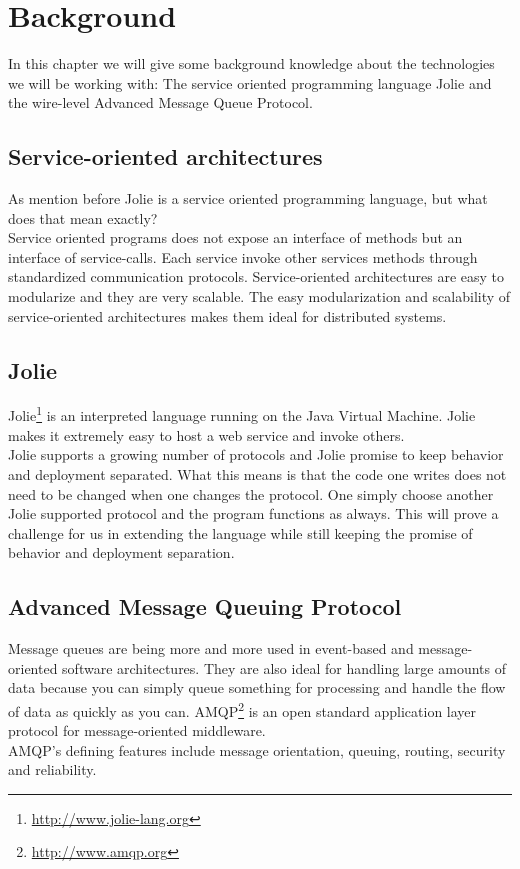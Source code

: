 \section{Background}
In this chapter we will give some background knowledge about the technologies we will be working with: The service oriented programming language Jolie and the wire-level Advanced Message Queue Protocol.
\subsection{Service-oriented architectures}
As mention before Jolie is a service oriented programming language, but what does that mean exactly?\\
Service oriented programs does not expose an interface of methods but an interface of service-calls. Each service invoke other services methods through standardized communication protocols. Service-oriented architectures are easy to modularize and they are very scalable. The easy modularization and scalability of service-oriented architectures makes them ideal for distributed systems.
\subsection{Jolie}
Jolie\footnote{\url{http://www.jolie-lang.org}} is an interpreted language running on the Java Virtual Machine. Jolie makes it extremely easy to host a web service and invoke others.\\
Jolie supports a growing number of protocols and Jolie promise to keep behavior and deployment separated. What this means is that the code one writes does not need to be changed when one changes the protocol. One simply choose another Jolie supported protocol and the program functions as always. This will prove a challenge for us in extending the language while still keeping the promise of behavior and deployment separation.
\subsection{Advanced Message Queuing Protocol}
Message queues are being more and more used in event-based and message-oriented software architectures. They are also ideal for handling large amounts of data because you can simply queue something for processing and handle the flow of data as quickly as you can. AMQP\footnote{\url{http://www.amqp.org}} is an open standard application layer protocol for message-oriented middleware.\\
AMQP's defining features include message orientation, queuing, routing, security and reliability.
